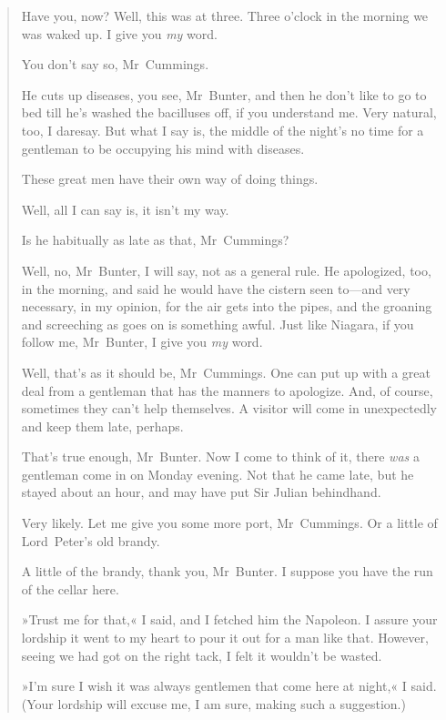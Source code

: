 \begin{quotation}
\begin{dialogue}
 Have you, now? Well, this was at three. Three o'clock in the morning we was waked up. I give you \textit{my} word.

 You don't say so, Mr~Cummings.

 He cuts up diseases, you see, Mr~Bunter, and then he don't like to go to bed till he's washed the bacilluses off, if you understand me. Very natural, too, I daresay. But what I say is, the middle of the night's no time for a gentleman to be occupying his mind with diseases.

 These great men have their own way of doing things.

 Well, all I can say is, it isn't my way.


 Is he habitually as late as that, Mr~Cummings?

 Well, no, Mr~Bunter, I will say, not as a general rule. He apologized, too, in the morning, and said he would have the cistern seen to—and very necessary, in my opinion, for the air gets into the pipes, and the groaning and screeching as goes on is something awful. Just like Niagara, if you follow me, Mr~Bunter, I give you \textit{my} word.

 Well, that's as it should be, Mr~Cummings. One can put up with a great deal from a gentleman that has the manners to apologize. And, of course, sometimes they can't help themselves. A visitor will come in unexpectedly and keep them late, perhaps.

 That's true enough, Mr~Bunter. Now I come to think of it, there \textit{was} a gentleman come in on Monday evening. Not that he came late, but he stayed about an hour, and may have put Sir Julian behindhand.

 Very likely. Let me give you some more port, Mr~Cummings. Or a little of Lord~Peter's old brandy.

 A little of the brandy, thank you, Mr~Bunter. I suppose you have the run of the cellar here. 
\end{dialogue}

»Trust me for that,« I said, and I fetched him the Napoleon. I assure your lordship it went to my heart to pour it out for a man like that. However, seeing we had got on the right tack, I felt it wouldn't be wasted.

»I'm sure I wish it was always gentlemen that come here at night,« I said. (Your lordship will excuse me, I am sure, making such a suggestion.)
\end{quotation}


